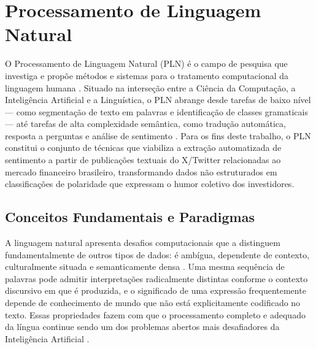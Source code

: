 
\section{Processamento de Linguagem Natural}
\label{sec:pln}

O Processamento de Linguagem Natural (PLN) é o campo de pesquisa que investiga e propõe métodos e sistemas para o tratamento computacional da linguagem humana \cite{caseli2024cap1}. Situado na interseção entre a Ciência da Computação, a Inteligência Artificial e a Linguística, o PLN abrange desde tarefas de baixo nível --- como segmentação de texto em palavras e identificação de classes gramaticais --- até tarefas de alta complexidade semântica, como tradução automática, resposta a perguntas e análise de sentimento \cite{jurafsky2026}. Para os fins deste trabalho, o PLN constitui o conjunto de técnicas que viabiliza a extração automatizada de sentimento a partir de publicações textuais do X/Twitter relacionadas ao mercado financeiro brasileiro, transformando dados não estruturados em classificações de polaridade que expressam o humor coletivo dos investidores.


\subsection{Conceitos Fundamentais e Paradigmas}
\label{subsec:pln_paradigmas}

A linguagem natural apresenta desafios computacionais que a distinguem fundamentalmente de outros tipos de dados: é ambígua, dependente de contexto, culturalmente situada e semanticamente densa \cite{caseli2024cap1}. Uma mesma sequência de palavras pode admitir interpretações radicalmente distintas conforme o contexto discursivo em que é produzida, e o significado de uma expressão frequentemente depende de conhecimento de mundo que não está explicitamente codificado no texto. Essas propriedades fazem com que o processamento completo e adequado da língua continue sendo um dos problemas abertos mais desafiadores da Inteligência Artificial \cite{caseli2024cap1,jurafsky2026}.

